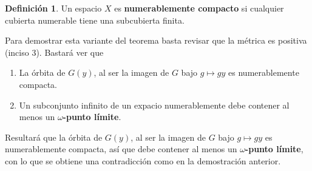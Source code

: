 \documentclass[spanish]{article}
\theoremstyle{definition}
\newtheorem*{defn}{Definición}
\begin{document}
	\begin{defn}
		Un espacio $X$ es \textbf{numerablemente compacto} si cualquier cubierta numerable tiene una subcubierta finita.
	\end{defn}
	
	Para demostrar esta variante del teorema basta revisar que la métrica es positiva (inciso 3). Bastará ver que
	
	\begin{enumerate}
		\item La órbita de $G(y)$, al ser la imagen de $G$ bajo $g\mapsto gy$ es numerablemente compacta.
		\item Un subconjunto infinito de un expacio numerablemente debe contener al menos un $\omega$\textbf{-punto límite}. 
	\end{enumerate}Resultará que la órbita de $G(y)$, al ser la imagen de $G$ bajo $g\mapsto gy$ es numerablemente compacta, así que debe contener al menos un $\omega$\textbf{-punto límite}, con lo que se obtiene una contradicción como en la demostración anterior.
	
\end{document}
